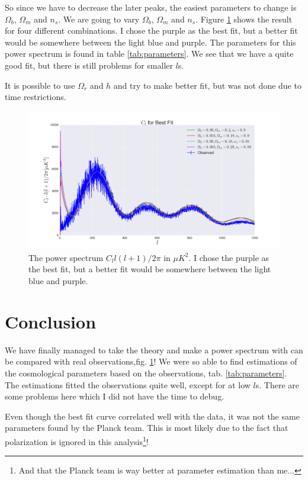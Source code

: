 \documentclass[a4paper,norsk, 10pt]{article}
\begin{document}
So since we have to decrease the later peaks, the easiest parameters to change is $\Omega_b$, $\Omega_m$ and $n_s$. We are going to vary $\Omega_b$, $\Omega_m$ and $n_s$. Figure \ref{fig:Cl_bf} shows the result for four different combinations. I chose the purple as the best fit, but a better fit would be somewhere between the light blue and purple. The parameters for this power spectrum is found in table \ref{tab:parameters}. We see that we have a quite good fit, but there is still problems for smaller $l$s. 

It is possible to use $\Omega_r$ and $h$ and try to make better fit, but was not done due to time restrictions. 


\begin{figure}[!htbp]
\centering
\includegraphics[scale=0.25]{Cl_bf.png}
\caption{The power spectrum $C_l l(l+1)/2\pi$ in $\mu K^2$. I chose the purple as the best fit, but a better fit would be somewhere between the light blue and purple.}\label{fig:Cl_bf}
\end{figure}

\section{Conclusion}

We have finally managed to take the theory and make a power spectrum with can be compared with real observations,fig. \ref{fig:Cl_bf}! We were so able to find estimations of the cosmological parameters based on the observations, tab. \ref{tab:parameters}. The estimations fitted the observations quite well, except for at low $l$s. There are some problems here which I did not have the time to debug.

Even though the best fit curve correlated well with the data, it was not the same parameters found by the Planck team. This is most likely due to the fact that polarization is ignored in this analysis\footnote{And that the Planck team is way better at parameter estimation than me...}!
\end{document}
